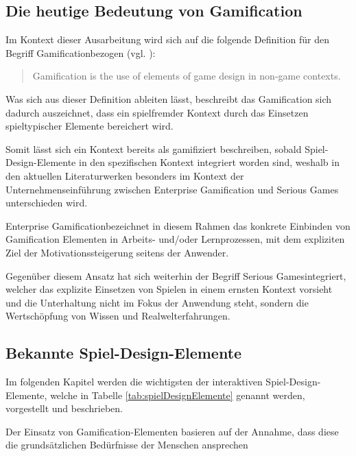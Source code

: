 \documentclass[bibliography=totoc,listof=totoc,BCOR=5mm,DIV=12,oneside]{scrbook}
\begin{document}
\subsection{Die heutige Bedeutung von Gamification}
\par Im Kontext dieser Ausarbeitung wird sich auf die folgende Definition für den Begriff \grqq Gamification\grqq bezogen (vgl. \citep{deterding2011gamification}): 
\begin{quotation} 
Gamification is the use of elements of game design in non-game contexts. 
\end{quotation}
\par Was sich aus dieser Definition ableiten lässt, beschreibt das Gamification sich dadurch auszeichnet, dass ein spielfremder Kontext  durch das Einsetzen spieltypischer Elemente bereichert wird.
\par Somit lässt sich ein Kontext bereits als \grqq gamifiziert\grqq{}
beschreiben, sobald Spiel-Design-Elemente in den spezifischen Kontext integriert worden sind, weshalb in den aktuellen Literaturwerken besonders im Kontext der Unternehmenseinführung zwischen Enterprise Gamification und Serious Games unterschieden wird\citep[vlg. Kapitel 1.1 Gamification: Definition und Abgrenzung, Seite 4]{Sailer2016}.
\par \bigskip \grqq Enterprise Gamification\grqq bezeichnet in diesem Rahmen das konkrete Einbinden von Gamification Elementen in Arbeits- und/oder Lernprozessen, mit dem expliziten Ziel der Motivationssteigerung seitens der Anwender.
\par \bigskip Gegenüber diesem Ansatz hat sich weiterhin der Begriff \grqq Serious Games\grqq integriert, welcher das explizite Einsetzen von Spielen in einem ernsten Kontext vorsieht und die Unterhaltung nicht im Fokus der Anwendung steht, sondern die Wertschöpfung von Wissen und Realwelterfahrungen. 

\subsection{Bekannte Spiel-Design-Elemente} \label{sub:grundlagenSpielDesignElemente}

\par Im folgenden Kapitel werden die wichtigsten der interaktiven Spiel-Design-Elemente, welche in Tabelle \ref{tab:spielDesignElemente} genannt werden, vorgestellt und beschrieben. 
\par Der Einsatz von Gamification-Elementen basieren auf der Annahme, dass diese die grundsätzlichen Bedürfnisse der Menschen ansprechen\citep[Kapitel 1.1 Enterprise Gamification - Vorgehen und Anwendung, Seite 5]{Sailer2016}
\end{document}
